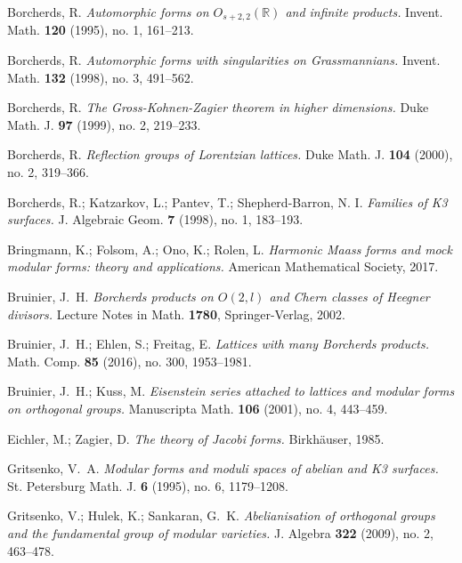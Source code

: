 \documentclass[12pt]{amsart}
\numberwithin{equation}{section}
\theoremstyle{definition}
\theoremstyle{remark}
\newcommand{\R}{\mathbb{R}}
\begin{document}

\begin{thebibliography}{99}


Borcherds, R. 
\textit{Automorphic forms on $O_{s+2,2}({\R})$ and infinite products.} 
Invent. Math. \textbf{120} (1995), no. 1, 161--213. 

Borcherds, R. 
\textit{Automorphic forms with singularities on Grassmannians.} 
Invent. Math. \textbf{132} (1998), no. 3, 491--562. 

Borcherds, R. 
\textit{The Gross-Kohnen-Zagier theorem in higher dimensions.} 
Duke Math. J. \textbf{97} (1999), no. 2, 219--233. 

Borcherds, R. 
\textit{Reflection groups of Lorentzian lattices.} 
Duke Math. J. \textbf{104} (2000), no. 2, 319--366. 

Borcherds, R.; Katzarkov, L.; Pantev, T.; Shepherd-Barron, N. I. 
\textit{Families of K3 surfaces.} 
J. Algebraic Geom. \textbf{7} (1998), no. 1, 183--193. 

Bringmann, K.; Folsom, A.; Ono, K.; Rolen, L. 
\textit{Harmonic Maass forms and mock modular forms: theory and applications.}  
American Mathematical Society, 2017. 

Bruinier, J.~H.
\textit{Borcherds products on $O(2, l)$ and Chern classes of Heegner divisors.} 
Lecture Notes in Math. \textbf{1780}, Springer-Verlag, 2002. 

Bruinier, J.~H.; Ehlen, S.; Freitag, E. 
\textit{Lattices with many Borcherds products.}  
Math. Comp. \textbf{85} (2016), no. 300, 1953--1981. 

Bruinier, J.~H.; Kuss, M. 
\textit{Eisenstein series attached to lattices and modular forms on orthogonal groups.} 
Manuscripta Math. \textbf{106} (2001), no. 4, 443--459. 

Eichler, M.; Zagier, D. 
\textit{The theory of Jacobi forms.} 
Birkh\"auser, 1985. 

Gritsenko, V.~A. 
\textit{Modular forms and moduli spaces of abelian and K3 surfaces.} 
St. Petersburg Math. J. \textbf{6} (1995), no. 6, 1179--1208.  

Gritsenko, V.; Hulek, K.; Sankaran, G.~K.
\textit{Abelianisation of orthogonal groups and the fundamental group of modular varieties.} 
J. Algebra \textbf{322} (2009), no. 2, 463--478. 


\end{thebibliography}
\end{document}
